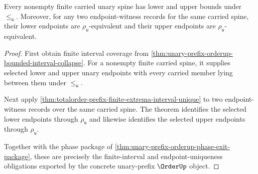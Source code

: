 \begin{theorem}
\label{thm:orderup-finite-interval-endpoint-obligation}
Every nonempty finite carried unary spine has lower and upper bounds under
$\le_{\mathsf{u}}$. Moreover, for any two endpoint-witness records for the
same carried spine, their lower endpoints are $\rho_{\mathsf{u}}$-equivalent
and their upper endpoints are $\rho_{\mathsf{u}}$-equivalent.
\end{theorem}
\begin{proof}
First obtain finite interval coverage from
\autoref{thm:unary-prefix-orderup-bounded-interval-collapse}. For a nonempty
finite carried spine, it supplies selected lower and upper unary endpoints
with every carried member lying between them under $\le_{\mathsf{u}}$.

Next apply
\autoref{thm:totalorder-prefix-finite-extrema-interval-unique} to two
endpoint-witness records over the same carried spine. The theorem identifies
the selected lower endpoints through $\rho_{\mathsf{u}}$ and likewise
identifies the selected upper endpoints through $\rho_{\mathsf{u}}$.

Together with the phase package of
\autoref{thm:unary-prefix-orderup-phase-exit-package}, these are precisely the
finite-interval and endpoint-uniqueness obligations exported by the concrete
unary-prefix $\OrderUp$ object.
\end{proof}

